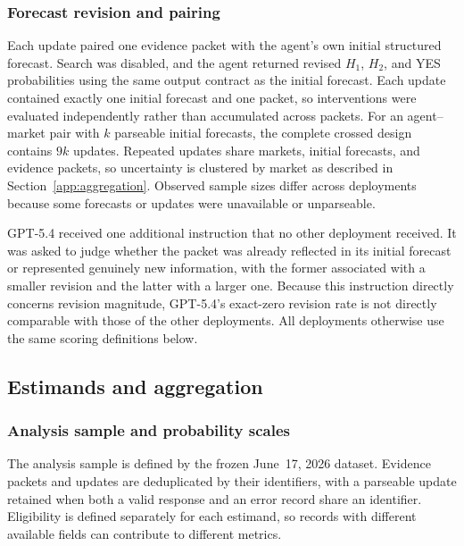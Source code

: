 \subsubsection{Forecast revision and pairing}
\label{app:update-protocol}

Each update paired one evidence packet with the agent's own initial structured forecast.
Search was disabled, and the agent returned revised $H_1$, $H_2$, and YES probabilities using the same output contract as the initial forecast.
Each update contained exactly one initial forecast and one packet, so interventions were evaluated independently rather than accumulated across packets.
For an agent--market pair with $k$ parseable initial forecasts, the complete crossed design contains $9k$ updates.
Repeated updates share markets, initial forecasts, and evidence packets, so uncertainty is clustered by market as described in Section~\ref{app:aggregation}.
Observed sample sizes differ across deployments because some forecasts or updates were unavailable or unparseable.

GPT-5.4 received one additional instruction that no other deployment received.
It was asked to judge whether the packet was already reflected in its initial forecast or represented genuinely new information, with the former associated with a smaller revision and the latter with a larger one.
Because this instruction directly concerns revision magnitude, GPT-5.4's exact-zero revision rate is not directly comparable with those of the other deployments.
All deployments otherwise use the same scoring definitions below.

\subsection{Estimands and aggregation}
\label{app:metrics}

\subsubsection{Analysis sample and probability scales}
\label{app:record-processing}

The analysis sample is defined by the frozen June~17, 2026 dataset.
Evidence packets and updates are deduplicated by their identifiers, with a parseable update retained when both a valid response and an error record share an identifier.
Eligibility is defined separately for each estimand, so records with different available fields can contribute to different metrics.


